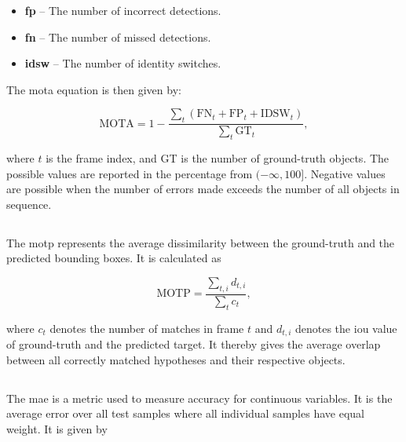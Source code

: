         \begin{itemize}
            \item \textbf{\Gls{fp}} -- The number of incorrect detections.
            \item \textbf{\Gls{fn}} -- The number of missed detections.
            \item \textbf{\Gls{idsw}} -- The number of identity switches.
        \end{itemize}

        The \gls{mota} equation is then given by:
        
        \begin{equation}
            \text{MOTA} = 1 - \frac{\sum_{t} \left( \text{FN}_t + \text{FP}_t + \text{IDSW}_t \right)}{\sum_{t}\text{GT}_t},
        \end{equation}
        
        where $t$ is the frame index, and GT is the number of ground-truth objects. The possible values are reported in the percentage from $(-\infty, 100]$. Negative values are possible when the number of errors made exceeds the number of all objects in sequence.
    
    \subsection{} 
        The \gls{motp} \cite{MOTChallenge2015}  represents the average dissimilarity between the ground-truth and the predicted bounding boxes. It is calculated as 
        
        \begin{equation}
            \text{MOTP} = \frac{\sum_{t,i} d_{t,i}}{\sum_{t}c_t},
        \end{equation}
        
        where $c_t$ denotes the number of matches in frame $t$ and $d_{t,i}$ denotes the \gls{iou} value of ground-truth and the predicted target. It thereby gives the average overlap between all correctly matched hypotheses and their respective objects. \cite{MOTChallenge2015}
    
    \subsection{} 
        The \gls{mae} \cite{willmott2005advantages} is a metric used to measure accuracy for continuous variables. It is the average error over all test samples where all individual samples have equal weight. It is given by
       
